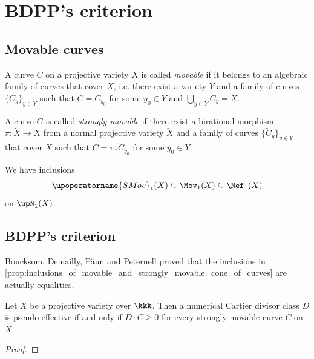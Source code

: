\section{BDPP's criterion}


\subsection{Movable curves}


  \begin{definition}
    A curve $C$ on a projective variety $X$ is called \emph{movable} if it belongs to an algebraic family of curves that cover $X$, i.e. there exist a variety $Y$ and a family of curves $\{C_y\}_{y \in Y}$ such that $C = C_{y_0}$ for some $y_0 \in Y$ and $\bigcup_{y \in Y} C_y = X$.
    \Yang{}
  \end{definition}


  \begin{definition}
    A curve $C$ is called \emph{strongly movable} if there exist a birational morphism $\pi: \tilde{X} \to X$ from a normal projective variety $\tilde{X}$ and a family of curves $\{\tilde{C}_y\}_{y \in Y}$ that cover $\tilde{X}$ such that $C = \pi_* \tilde{C}_{y_0}$ for some $y_0 \in Y$.
    \Yang{}
  \end{definition}


  \begin{proposition}\label{prop:inclusions_of_movable_and_strongly_movable_cone_of_curves}
    We have inclusions
    \[ \upoperatorname{SMov}_1(X) \subseteq \Mov_1(X) \subseteq \Nef_1(X) \]
    on $\upN_1(X)$.
    \Yang{}
  \end{proposition}



\subsection{BDPP's criterion}

  Boucksom, Demailly, P\u{a}un and Peternell proved that the inclusions in \cref{prop:inclusions_of_movable_and_strongly_movable_cone_of_curves} are actually equalities.

  \begin{theorem}
    Let $X$ be a projective variety over $\kkk$.
    Then a numerical Cartier divisor class $D$ is pseudo-effective if and only if $D \cdot C \geq 0$ for every strongly movable curve $C$ on $X$.
    \Yang{}
  \end{theorem}
  \begin{proof}
    \Yang{}
  \end{proof}

